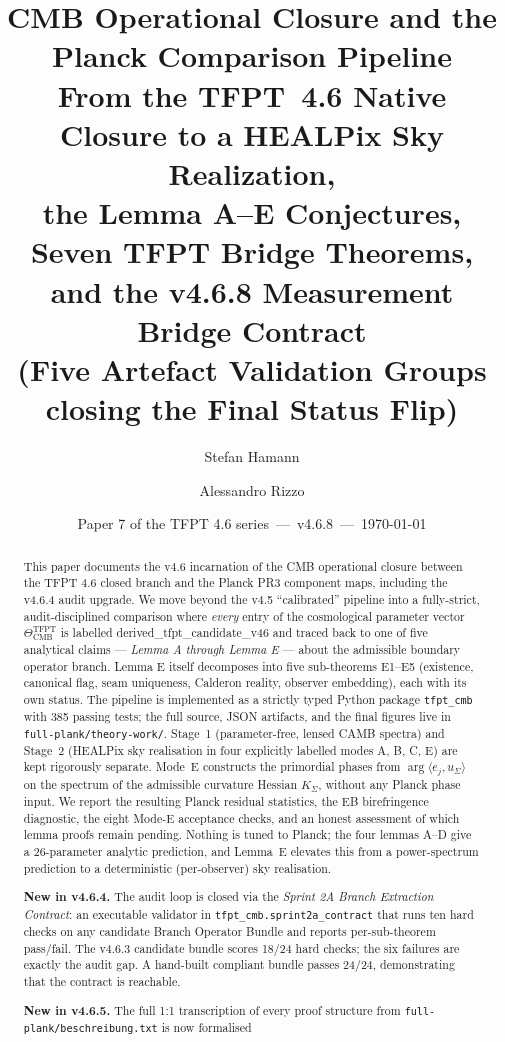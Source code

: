 \documentclass[11pt,a4paper]{article}
\title{\color{tfptblue}\textbf{CMB Operational Closure and the\\
Planck Comparison Pipeline}\\[0.35em]
{\Large From the TFPT~4.6 Native Closure to a HEALPix Sky Realization,\\
the Lemma A--E Conjectures, Seven TFPT Bridge Theorems,\\
and the v4.6.8 Measurement Bridge Contract\\
(Five Artefact Validation Groups closing the Final Status Flip)}}
\author{Stefan Hamann \and Alessandro Rizzo}
\date{{\normalsize\color{tfptgray}\sffamily Paper 7 of the TFPT 4.6 series \,---\, v4.6.8 \,---\, \today}}
\begin{document}
\maketitle

\begin{abstract}
This paper documents the v4.6 incarnation of the CMB operational
closure between the TFPT 4.6 closed branch and the Planck PR3 component
maps, including the v4.6.4 audit upgrade.  We move beyond the v4.5
``calibrated'' pipeline into a fully-strict, audit-disciplined
comparison where \emph{every} entry of the cosmological parameter
vector \(\Theta_{\mathrm{CMB}}^{\mathrm{TFPT}}\) is labelled
\textsf{derived\_tfpt\_candidate\_v46} and traced back to one of five
analytical claims --- \emph{Lemma A through Lemma E} --- about the
admissible boundary operator branch.  Lemma E itself decomposes into
five sub-theorems E1--E5 (existence, canonical flag, seam uniqueness,
Calderon reality, observer embedding), each with its own status.  The
pipeline is implemented as a strictly typed Python package
\texttt{tfpt\_cmb} with 385 passing tests; the full source, JSON
artifacts, and the final figures live in
\texttt{full-plank/theory-work/}.  Stage~1 (parameter-free, lensed CAMB
spectra) and Stage~2 (HEALPix sky realisation in four explicitly
labelled modes A, B, C, E) are kept rigorously separate.  Mode~E
constructs the primordial phases from
\(\arg\langle e_j,u_\Sigma\rangle\) on the spectrum of the admissible
curvature Hessian \(K_\Sigma\), without any Planck phase input.  We
report the resulting Planck residual statistics, the EB birefringence
diagnostic, the eight Mode-E acceptance checks, and an honest
assessment of which lemma proofs remain pending.  Nothing is tuned to
Planck; the four lemmas A--D give a 26-parameter analytic prediction,
and Lemma~E elevates this from a power-spectrum prediction to a
deterministic (per-observer) sky realisation.\par
\textbf{New in v4.6.4.}  The audit loop is closed via the
\emph{Sprint 2A Branch Extraction Contract}: an executable validator
in \texttt{tfpt\_cmb.sprint2a\_contract} that runs ten hard checks on
any candidate Branch Operator Bundle and reports per-sub-theorem
pass/fail.  The v4.6.3 candidate bundle scores 18/24 hard checks;
the six failures are exactly the audit gap.  A hand-built compliant
bundle passes 24/24, demonstrating that the contract is reachable.
\par
\textbf{New in v4.6.5.}  The full 1:1 transcription of every proof
structure from \texttt{full-plank/beschreibung.txt} is now formalised

\end{abstract}
\end{document}
